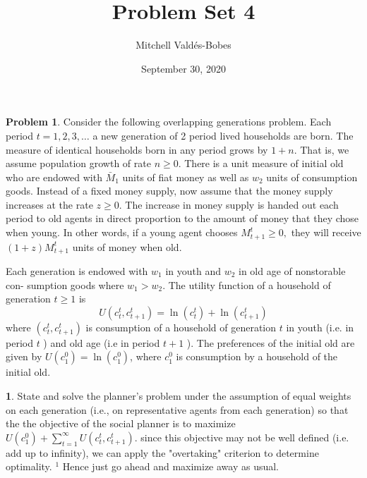 \documentclass{article}
\title{Problem Set 4}
\author{Mitchell Valdés-Bobes}
\date{September 30, 2020}
\theoremstyle{definition}
\newtheorem{problem}{Problem}
\newtheorem{subproblem}{}[problem]
\begin{document}
\maketitle
\begin{problem}
Consider the following overlapping generations problem. Each period $t=1,2,3, \ldots$ a
new generation of 2 period lived households are born. The measure of identical households
born in any period grows by $1+n .$ That is, we assume population growth of rate $n \geq 0$.
There is a unit measure of initial old who are endowed with $\bar{M}_{1}$ units of fiat money as
well as $w_{2}$ units of consumption goods. Instead of a fixed money supply, now assume that
the money supply increases at the rate $z \geq 0 .$ The increase in money supply is handed out
each period to old agents in direct proportion to the amount of money that they chose when
young. In other words, if a young agent chooses $M_{t+1}^{t} \geq 0,$ they will receive $(1+z) M_{t+1}^{t}$
units of money when old.

Each generation is endowed with $w_{1}$ in youth and $w_{2}$ in old age of nonstorable con-
sumption goods where $w_{1}>w_{2}$. The utility function of a household of generation $t \geq 1$
is
$$
U\left(c_{t}^{t}, c_{t+1}^{t}\right)=\ln \left(c_{t}^{t}\right)+\ln \left(c_{t+1}^{t}\right)
$$
where $\left(c_{t}^{t}, c_{t+1}^{t}\right)$ is consumption of a household of generation $t$ in youth (i.e. in period $t$ ) and
old age (i.e in period $t+1$ ). The preferences of the initial old are given by $U\left(c_{1}^{0}\right)=\ln \left(c_{1}^{0}\right)$,
where $c_{1}^{0}$ is consumption by a household of the initial old.
\end{problem}

\begin{subproblem}
State and solve the planner's problem under the assumption of equal weights on
each generation (i.e., on representative agents from each generation) so that the
the objective of the social planner is to maximize $U\left(c_{1}^{0}\right)+\sum_{t=1}^{\infty} U\left(c_{t}^{t}, c_{t+1}^{t}\right) .$ since
this objective may not be well defined (i.e. add up to infinity), we can apply the "overtaking" criterion to determine optimality. $^{1}$ Hence just go ahead and maximize
away as usual.
\end{subproblem}
\end{document}
